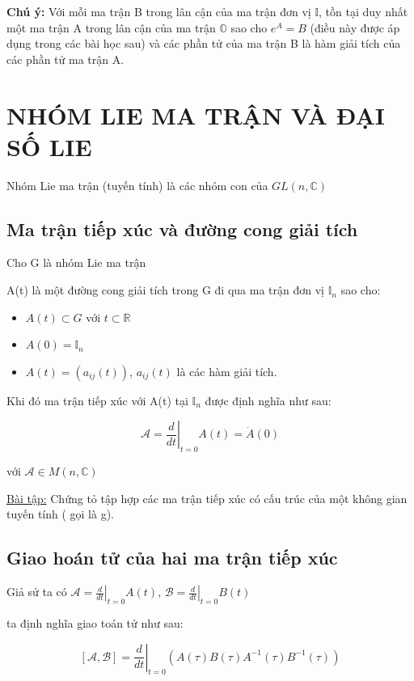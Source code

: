 \documentclass{report}
\begin{document}
\textbf{Chú ý:} Với mỗi ma trận B trong lân cận của ma trận đơn vị \( \mathbb{I} \), tồn tại duy nhất một ma trận A trong lân cận của ma trận \( \mathbb{O} \) sao cho \( e^{A} = B \) (điều này được áp dụng trong các bài học sau) và các phần tử của ma trận B là hàm giải tích của các phần tử ma trận A.

\chapter{NHÓM LIE MA TRẬN VÀ ĐẠI SỐ LIE}

Nhóm Lie ma trận (tuyến tính) là các nhóm con của \( GL(n,\mathbb{C}) \)

\section{Ma trận tiếp xúc và đường cong giải tích}

Cho G là nhóm Lie ma trận

A(t) là một đường cong giải tích trong G đi qua ma trận đơn vị \( \mathbb{I}_{n} \) sao cho:

	\begin{itemize}
		\item \( A(t) \subset G \) với \( t \subset \mathbb{R} \)
		\item \( A(0) = \mathbb{I}_{n} \)
		\item \( A(t) = (a_{ij}(t)) \), \(a_{ij}(t) \) là các hàm giải tích.
	\end{itemize}

Khi đó ma trận tiếp xúc với A(t) tại \( \mathbb{I}_{n} \) được định nghĩa như sau:

\[ \mathcal{A} = \left. {\frac{d}{dt}} \right|_{t=0} A(t) = \dot{A}(0) \] 

với \( \mathcal{A} \in  M(n,\mathbb{C}) \) 

\underline{Bài tập:} Chứng tỏ tập hợp các ma trận tiếp xúc có cấu trúc của một không gian tuyến tính ( gọi là g). 

\section{Giao hoán tử của hai ma trận tiếp xúc}

Giả sử ta có \( \mathcal{A} = \left. {\frac{d}{dt}} \right|_{t=0} A(t) \), \( \mathcal{B} = \left. {\frac{d}{dt}} \right|_{t=0} B(t) \)

ta định nghĩa giao toán tử như sau:

\[ [\mathcal{A}, \mathcal{B}] = \left. {\frac{d}{dt}} \right|_{t=0} (A(\tau)B(\tau)A^{-1}(\tau)B^{-1}(\tau)) \]
\end{document}

